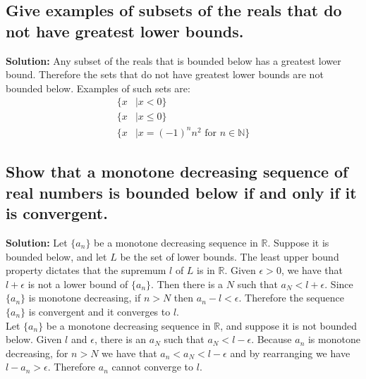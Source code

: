 \documentclass{article}
\newcommand{\exercise}[1]{\subsection{\normalfont #1}}
\newcommand{\solution}{\indent\indent \textbf{Solution: }}
\begin{document}
\exercise{Give examples of subsets of the reals that do not have greatest lower bounds.}
\solution Any subset of the reals that is bounded below has a greatest lower bound. Therefore the sets that do not have greatest lower bounds are not bounded below. Examples of such sets are:
\begin{align*}
\{x &\mid x < 0\} \\ 
\{x &\mid x \leq 0\} \\ 
\{x &\mid x = (-1)^nn^2 \text{ for } n\in \mathbb{N}\}
\end{align*}
\exercise{Show that a monotone decreasing sequence of real numbers is bounded below if and only if it is convergent.}
\solution Let $\{a_n\}$ be a monotone decreasing sequence in $\mathbb{R}$. Suppose it is bounded below, and let $L$ be the set of lower bounds. The least upper bound property dictates that the supremum $l$ of $L$ is in $\mathbb{R}$. Given $\epsilon >0$, we have that $l+\epsilon$ is not a lower bound of $\{a_n\}$. Then there is a $N$ such that $a_N < l+\epsilon$. Since $\{a_n\}$ is monotone decreasing, if $n>N$ then  $a_n-l < \epsilon$. Therefore the sequence $\{a_n\}$ is convergent and it converges to $l$. \\
\indent Let $\{a_n\}$ be a monotone decreasing sequence in $\mathbb{R}$, and suppose it is not bounded below. Given $l$ and $\epsilon$, there is an $a_N$ such that $a_N < l-\epsilon$. Because $a_n$ is monotone decreasing, for $n>N$ we have that $a_n < a_N < l-\epsilon$ and by rearranging we have $l - a_n > \epsilon$. Therefore $a_n$ cannot converge to $l$. 

\newpage
\end{document}
